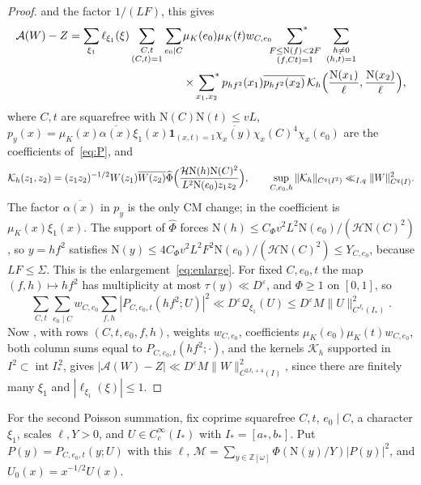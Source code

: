 \documentclass[11pt]{article}
\numberwithin{equation}{section}
\newcommand{\OO}{\mathbb Z[\omega]}
\newcommand{\N}{\mathrm N}
\newcommand{\muk}{\mu_K}
\newcommand{\ind}{\mathbf1}
\newcommand{\ssum}{\sideset{}{^*}\sum}
\begin{document}
\begin{proof}
and the factor $1/(LF)$, this gives
\begin{equation}\label{eq:b4-first-id}
\begin{split}
 \mathcal A(W)-Z=\sum_{\xi_1}\ell_{\xi_1}(\xi)\sum_{\substack{C,t\\(C,t)=1}}\sum_{e_0\mid C}
 &\muk(e_0)\muk(t)w_{C,e_0}\ssum_{\substack{F\le\N(f)<2F\\(f,Ct)=1}}\ \sum_{\substack{h\ne0\\(h,t)=1}}\\
 &\times\ssum_{x_1,x_2}p_{hf^2}(x_1)\overline{p_{hf^2}(x_2)}\,
 \mathcal K_h\Bigl(\frac{\N(x_1)}\ell,\frac{\N(x_2)}\ell\Bigr),
\end{split}
\end{equation}
where $C,t$ are squarefree with $\N(C)\N(t)\le vL$,
$p_y(x)=\muk(x)\overline{\alpha(x)}\xi_1(x)\ind_{(x,t)=1}\overline{\chi_x(y)}\chi_x(C)^4\chi_x(e_0)$
are the coefficients of~\eqref{eq:P}, and
\begin{equation}\label{eq:d064}
 \mathcal K_h(z_1,z_2)=(z_1z_2)^{-1/2}W(z_1)\overline{W(z_2)}
 \widehat\Phi\Bigl(\frac{\mathcal H\N(h)\N(C)^2}{L^2\N(e_0)z_1z_2}\Bigr),\qquad
 \sup_{C,e_0,h}\|\mathcal K_h\|_{C^q(I^2)}\ll_{I,q}\|W\|_{C^q(I)}^2.
\end{equation}
The factor $\overline{\alpha(x)}$ in $p_y$ is the only CM change; in \cite[(7.1)]{OAI1112} the
coefficient is $\muk(x)\xi_1(x)$. The support of $\widehat\Phi$ forces
$\N(h)\le C_\Phi v^2L^2\N(e_0)/(\mathcal H\N(C)^2)$, so $y=hf^2$ satisfies
$\N(y)\le4C_\Phi v^2L^2F^2\N(e_0)/(\mathcal H\N(C)^2)\le Y_{C,e_0}$, because $LF\le\Sigma$. This is
the enlargement~\eqref{eq:enlarge}. For fixed $C,e_0,t$ the map $(f,h)\mapsto hf^2$ has
multiplicity at most $\tau(y)\ll D^\varepsilon$, and $\Phi\ge1$ on $[0,1]$, so
\begin{equation}\label{eq:d065}
 \sum_{C,t}\sum_{e_0\mid C}w_{C,e_0}\sum_{f,h}|P_{C,e_0,t}(hf^2;U)|^2
 \ll D^\varepsilon\mathcal Q_{\xi_1}(U)\le D^\varepsilon M\|U\|_{C^{J_1}(I_*)}^2 .
\end{equation}
Now \cite[Lemma~B.2]{OAI1112}, with rows $(C,t,e_0,f,h)$, weights $w_{C,e_0}$, coefficients
$\muk(e_0)\muk(t)w_{C,e_0}$, both column sums equal to $P_{C,e_0,t}(hf^2;\cdot)$, and the kernels
$\mathcal K_h$ supported in $I^2\subset\operatorname{int}I_*^{\,2}$, gives
$|\mathcal A(W)-Z|\ll D^\varepsilon M\|W\|_{C^{2J_1+4}(I)}^2$, since there are finitely many $\xi_1$
and $|\ell_{\xi_1}(\xi)|\le1$.
\end{proof}

For the second Poisson summation, fix coprime squarefree $C,t$, $e_0\mid C$, a character $\xi_1$,
scales $\ell,Y>0$, and $U\in C_c^\infty(I_*)$ with $I_*=[a_*,b_*]$. Put $P(y)=P_{C,e_0,t}(y;U)$
with this $\ell$, $\mathcal M=\sum_{y\in\OO}\Phi(\N(y)/Y)|P(y)|^2$, and $U_0(x)=x^{-1/2}U(x)$.
\end{document}
